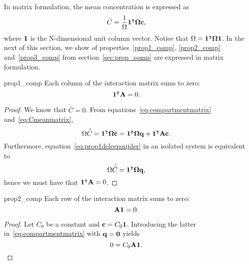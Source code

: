 In matrix formulation, the mean concentration is expressed as
\begin{equation} \label{eq:Cmeanmatrix}
	\bar C = \frac{1}{\Omega} \mathbf 1^\intercal \boldsymbol \Omega \mathbf c,
\end{equation}
where $\mathbf 1$ is the N-dimensional unit column vector. Notice that $\Omega = \mathbf 1^\intercal \boldsymbol \Omega \mathbf 1$. In the next of this section, we show of properties~\ref{prop1_comp}, \ref{prop2_comp} and~\ref{prop3_comp} from section~\ref{sec:prop_comp} are expressed in matrix formulation.
\begin{propertybis}{prop1_comp} \label{prop1bis_comp}
Each column of the interaction matrix sums to zero:
\begin{equation}
	\mathbf 1^\intercal \mathbf A = 0.
\end{equation}
\end{propertybis} 
\begin{proof}
	We know that $\dot{\bar C} = 0$. From equations~\eqref{eq:compartmentmatrix} and~\eqref{eq:Cmeanmatrix},
	\begin{equation}
		\Omega \dot{\bar{C}} = \mathbf 1^\intercal \boldsymbol \Omega \dot{\mathbf{c}} = \mathbf 1^\intercal \boldsymbol \Omega \mathbf q + \mathbf 1^\intercal\mathbf A \mathbf c.
	\end{equation}
	Furthermore, equation~\eqref{eq:prop1deleersnijder} in an isolated system is equivalent to
	\begin{equation}
		\Omega \dot{\bar{C}} = \mathbf 1^\intercal \boldsymbol \Omega \mathbf q,
	\end{equation}
	hence we must have that $\mathbf 1^\intercal \mathbf A = 0$.
\end{proof}

\begin{propertybis}{prop2_comp} \label{prop2bis_comp}
	Each row of the interaction matrix sums to zero:
	\begin{equation}
		\mathbf A \mathbf 1 = 0.		
	\end{equation}	
\end{propertybis}
\begin{proof}
	Let $C_0$ be a constant and $\mathbf c = C_0 \mathbf 1$. Introducing the latter in~\eqref{eq:compartmentmatrix} with $\mathbf q = \mathbf 0$ yields
	\begin{equation}
		0 = C_0 \mathbf A \mathbf 1.
	\end{equation}
\end{proof}

